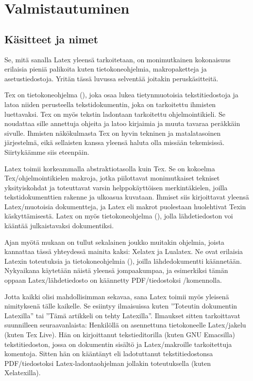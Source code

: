 \chapter{Valmistautuminen}

\section{Käsitteet ja nimet}

Se, mitä sanalla Latex yleensä tarkoitetaan, on monimutkainen
kokonaisuus erilaisia pieniä palikoita kuten tietokone\-ohjelmia,
makropaketteja ja asetustiedostoja. Yritän tässä luvussa selventää
joitakin peruskäsitteitä.

Tex on tietokone\-ohjelma (), joka osaa lukea tietynmuotoisia
tekstitiedostoja ja latoa niiden perusteella tekstidokumentin, joka on
tarkoitettu ihmisten luettavaksi. Tex on myös tekstin ladontaan
tarkoitettu ohjelmointikieli. Se noudattaa sille annettuja ohjeita ja
latoo kirjaimia ja muuta tavaraa peräkkäin sivulle. Ihmisten
näkökulmasta Tex on hyvin tekninen ja matalatasoinen järjestelmä, eikä
sellaisten kanssa yleensä haluta olla missään tekemisissä. Siirtykäämme
siis eteenpäin.

Latex toimii korkeammalla abstraktiotasolla kuin Tex. Se on kokoelma
Tex\-/ohjelmointikielen makroja, jotka piilottavat monimutkaiset
tekniset yksityiskohdat ja toteuttavat varsin helppokäyttöisen
merkintäkielen, joilla tekstidokumenttien rakenne ja ulko\-asua
kuvataan. Ihmiset siis kirjoittavat yleensä Latex\-/muotoisia
dokumentteja, ja Latex eli makrot puolestaan huolehtivat Texin
käskyttämisestä. Latex on myös tietokone\-ohjelma (), jolla
lähdetiedoston voi kääntää julkaistavaksi dokumentiksi.

Ajan myötä mukaan on tullut sekalainen joukko muitakin ohjelmia, joista
kannattaa tässä yhteydessä mainita kaksi: Xelatex ja Lualatex. Ne ovat
erilaisia Latexin toteutuksia ja tietokone\-ohjelmia (), joilla lähdedokumentti käännetään. Nyky\-aikana käytetään
näistä yleensä jompaakumpaa, ja esimerkiksi tämän oppaan
Latex\-/lähdetiedosto on käännetty PDF\-/tiedostoksi
\-/komennolla.

Jotta kaikki olisi mahdollisimman sekavaa, sana Latex toimii myös
yleisenä nimityksenä tälle kaikelle. Se esiintyy ilmaisuissa kuten
''Toteutin dokumentin Latexilla'' tai ''Tämä artikkeli on tehty
Latexilla''. Ilmaukset sitten tarkoittavat suunnilleen seuraavanlaista:
Henkilöllä on asennettuna tietokoneelle Latex\-/jakelu (kuten Tex Live).
Hän on kirjoittanut teksti\-editorilla (kuten GNU Emacsilla)
tekstitiedoston, jossa on dokumentin sisältö ja Latex\-/makroille
tarkoitettuja komentoja. Sitten hän on kääntänyt eli ladotuttanut
tekstitiedostonsa PDF\-/tiedostoksi Latex-la\-don\-ta\-oh\-jel\-man
jollakin toteutuksella (kuten Xelatexilla).

